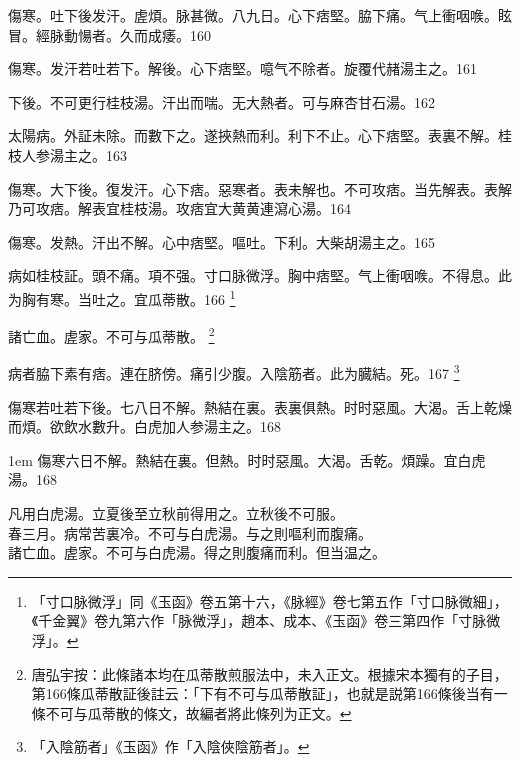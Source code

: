 傷寒。吐下{\khaai 後}发汗。虗煩。脉甚微。八九日。心下痞堅。脇下痛。气上衝咽㗋。眩冒。經脉動愓者。久而成痿。160

傷寒。发汗{\khaai 若}吐{\khaai 若}下。解後。心下痞堅。噫气不除者。旋覆代赭湯主之。161

下後。不可更行桂枝湯。汗出而喘。无大熱者。可与麻杏甘石湯。162

太陽病。外証未除。而數下之。遂挾熱而利。利下不止。心下痞堅。表裏不解。桂枝人参湯主之。163

傷寒。大下後。復发汗。心下痞。惡寒者。表未解也。不可攻痞。当先解表。表解乃可攻痞。解表宜桂枝湯。攻痞宜大黄黄連瀉心湯。164

傷寒。发熱。汗出不解。心中痞堅。嘔吐。下利。大柴胡湯主之。165

病如桂枝証。頭不痛。項不强。寸{\khaai 口}脉微浮。胸中痞堅。气上衝咽㗋。不得息。此为胸有寒。当吐之。宜瓜蒂散。166
	\footnote{
		「寸口脉微浮」同《玉函》卷五第十六，《脉經》卷七第五作「寸口脉微細」，《千金翼》卷九第六作「脉微浮」，趙本、成本、《玉函》卷三第四作「寸脉微浮」。
	}

諸亡血。虗家。不可与瓜蒂散。
	\footnote{
		唐弘宇按：此條諸本均在瓜蒂散煎服法中，未入正文。根據宋本獨有的子目，第166條瓜蒂散証後註云：「下有不可与瓜蒂散証」，也就是説第166條後当有一條不可与瓜蒂散的條文，故編者將此條列为正文。
	}

病者脇下素有痞。連在脐傍。痛引少腹。入陰筋者。此为臓結。死。167
	\footnote{
		「入陰筋者」《玉函》作「入陰俠陰筋者」。
	}

傷寒若吐若下後。七八日不解。熱結在裏。表裏俱熱。时时惡風。大渴。舌上乾燥而煩。欲飲水數升。白虎{\khaai 加人参}湯主之。168

\hangindent 1em
傷寒六日不解。熱結在裏。但熱。时时惡風。大渴。舌乾。煩躁。宜白虎湯。{\shenghui}168

凡用白虎湯。立夏後至立秋前得用之。立秋後不可服。\\
春三月。病常苦裏冷。不可与白虎湯。与之則嘔利而腹痛。\\
諸亡血。虗家。不可与白虎湯。得之則腹痛而利。但当温之。

